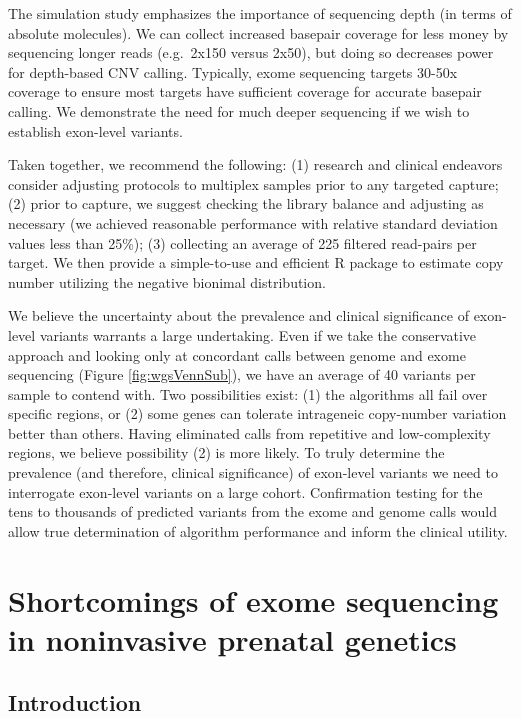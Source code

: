 \documentclass[11pt,letterpaper]{book}
\begin{document}
The simulation study emphasizes the importance of sequencing depth (in terms of absolute molecules).
We can collect increased basepair coverage for less money by sequencing longer reads (e.g.~2x150 versus 2x50), but doing so decreases power for depth-based CNV calling.
Typically, exome sequencing targets 30-50x coverage to ensure most targets have sufficient coverage for accurate basepair calling.
We demonstrate the need for much deeper sequencing if we wish to establish exon-level variants.

Taken together, we recommend the following:
(1) research and clinical endeavors consider adjusting protocols to multiplex samples prior to any targeted capture;
(2) prior to capture, we suggest checking the library balance and adjusting as necessary (we achieved reasonable performance with relative standard deviation values less than 25\%);
(3) collecting an average of 225 filtered read-pairs per target.
We then provide a simple-to-use and efficient R package to estimate copy number utilizing the negative bionimal distribution.

We believe the uncertainty about the prevalence and clinical significance of exon-level variants warrants a large undertaking.
Even if we take the conservative approach and looking only at concordant calls between genome and exome sequencing (Figure \ref{fig:wgsVennSub}), we have an average of 40 variants per sample to contend with.
Two possibilities exist: (1) the algorithms all fail over specific regions, or (2) some genes can tolerate intrageneic copy-number variation better than others.
Having eliminated calls from repetitive and low-complexity regions, we believe possibility (2) is more likely.
To truly determine the prevalence (and therefore, clinical significance) of exon-level variants we need to interrogate exon-level variants on a large cohort.
Confirmation testing for the tens to thousands of predicted variants from the exome and genome calls would allow true determination of algorithm performance and inform the clinical utility.

\hypertarget{cfES}{%
\chapter{Shortcomings of exome sequencing in noninvasive prenatal genetics}\label{cfES}}

\hypertarget{introduction-1}{%
\section{Introduction}\label{introduction-1}}
\end{document}
